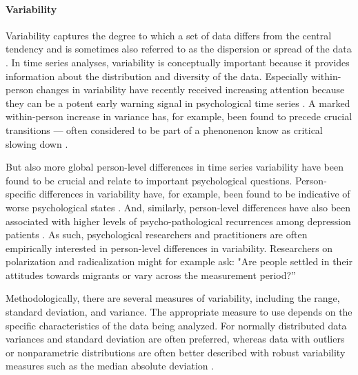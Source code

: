 \documentclass[man, 12pt, a4paper, mask, floatsintext]{apa7}
\theoremstyle{break}
\theoremstyle{plain}
\begin{document}
\paragraph{Variability} Variability captures the degree to which a set of data differs from the central tendency and is sometimes also referred to as the dispersion or spread of the data \citep{weisberg1992}. In time series analyses, variability is conceptually important because it provides information about the distribution and diversity of the data. Especially within-person changes in variability have recently received increasing attention because they can be a potent early warning signal in psychological time series \citep{helmich2020a, vandeleemput2014}. A marked within-person increase in variance has, for example, been found to precede crucial transitions --- often considered to be part of a phenonenon know as critical slowing down \citep[i.e., anomalous variances; e.g.,][]{scheffer2009, wichers2019}. 

But also more global person-level differences in time series variability have been found to be crucial and relate to important psychological questions. Person-specific differences in variability have, for example, been found to be indicative of worse psychological states \citep{myin-germeys2018}. And, similarly, person-level differences have also been associated with higher levels of psycho-pathological recurrences among depression patients \citep{timm2017}. As such, psychological researchers and practitioners are often empirically interested in person-level differences in variability. Researchers on polarization and radicalization might for example ask: "Are people settled in their attitudes towards migrants or vary across the measurement period?''

Methodologically, there are several measures of variability, including the range, standard deviation, and variance. The appropriate measure to use depends on the specific characteristics of the data being analyzed. For normally distributed data variances and standard deviation are often preferred, whereas data with outliers or nonparametric distributions are often better described with robust variability measures such as the median absolute deviation \citep{weisberg1992}.
\end{document}
